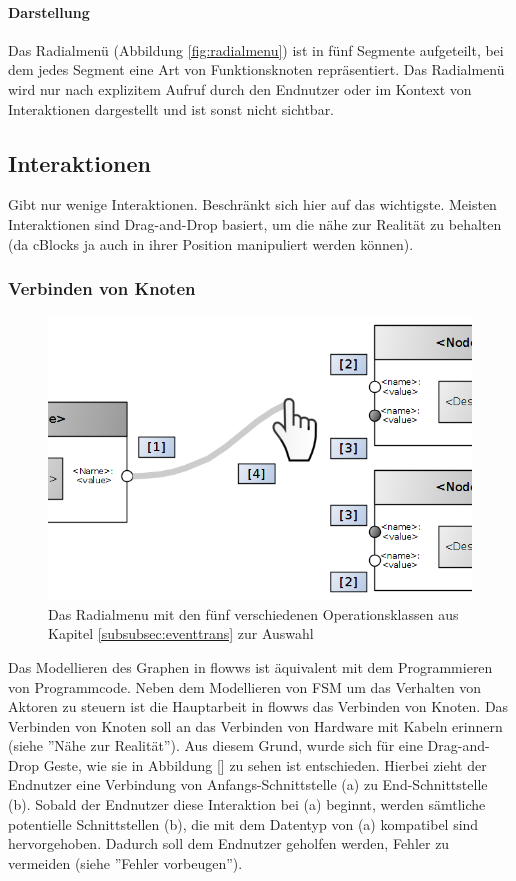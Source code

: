 \paragraph{Darstellung} Das Radialmenü (Abbildung \ref{fig:radialmenu}) ist in fünf Segmente aufgeteilt, bei dem jedes Segment eine Art von Funktionsknoten repräsentiert. Das Radialmenü wird nur nach explizitem Aufruf durch den Endnutzer oder im Kontext von Interaktionen dargestellt und ist sonst nicht sichtbar. 

\subsection{Interaktionen}

Gibt nur wenige Interaktionen. Beschränkt sich hier auf das wichtigste. Meisten Interaktionen sind Drag-and-Drop basiert, um die nähe zur Realität zu behalten (da cBlocks ja auch in ihrer Position manipuliert werden können).

\subsubsection{Verbinden von Knoten}

\begin{figure}[h]
  \centering
  \includegraphics[width=.75\textwidth]{bilder/chapter4/chapter4_3/connectNodes.png}
  \caption{Das Radialmenu mit den fünf verschiedenen Operationsklassen aus Kapitel \ref{subsubsec:eventtrans} zur Auswahl}
  \label{fig:connectNodesInteraction}
\end{figure}
Das Modellieren des Graphen in flowws ist äquivalent mit dem Programmieren von Programmcode. Neben dem Modellieren von \ac{FSM} um das Verhalten von Aktoren zu steuern ist die Hauptarbeit in flowws das Verbinden von Knoten. Das Verbinden von Knoten soll an das Verbinden von Hardware mit Kabeln erinnern (siehe ''Nähe zur Realität''). Aus diesem Grund, wurde sich für eine Drag-and-Drop Geste, wie sie in Abbildung [] zu sehen ist entschieden. Hierbei zieht der Endnutzer eine Verbindung von Anfangs-Schnittstelle (a) zu End-Schnittstelle (b). Sobald der Endnutzer diese Interaktion bei (a) beginnt, werden sämtliche potentielle Schnittstellen (b), die mit dem Datentyp von (a) kompatibel sind hervorgehoben. Dadurch soll dem Endnutzer geholfen werden, Fehler zu vermeiden (siehe ''Fehler vorbeugen'').

